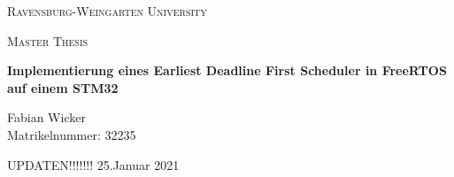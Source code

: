 \documentclass[../EDF Master Thesis.tex]{subfiles}
\begin{document}
    \centering
    {\scshape\LARGE Ravensburg-Weingarten University\par}
    \vspace{1.5cm}
    \begin{figure}[hb]
        \centering
        \rwulogo[width=0.4\columnwidth]
    \end{figure}
    \vspace{5cm}
    {\scshape\Large Master Thesis\par}
    \vspace{0.25cm}
    {\huge\bfseries Implementierung eines Earliest Deadline First Scheduler in FreeRTOS auf einem STM32\par}
    \vspace{4cm}
    {\Large Fabian Wicker \\
    Matrikelnummer: 32235\par}
    \vfill
    {\large UPDATEN!!!!!!! 25.Januar 2021\par}
\end{document}
